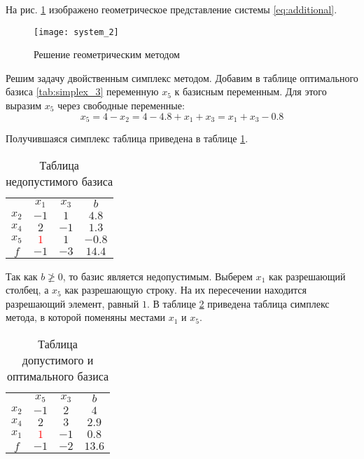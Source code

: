 На рис. \ref{pic:geometric_solution_2} изображено геометрическое представление системы \ref{eq:additional}.

\begin{figure}[H]
\begin{center}
	\texttt{[image: system\_2]}
	\caption{Решение геометрическим методом}
	\label{pic:geometric_solution_2}
\end{center}
\end{figure}

Решим задачу двойственным симплекс методом. Добавим в таблице оптимального базиса 
\ref{tab:simplex_3} переменную $x_5$ к базисным переменным. Для этого выразим $x_5$ через свободные переменные:
\begin{equation*}
x_5 = 4 - x_2 = 4 - 4.8 + x_1 + x_3 = x_1 + x_3 - 0.8
\end{equation*}

Получившаяся симплекс таблица приведена в таблице \ref{tab:simplex_4}.

\begin{table}[H]
\begin{center}
	\def\tabcolsep{15pt}
	\def\arraystretch{1.3}
	\caption{Таблица недопустимого базиса}
	\label{tab:simplex_4}
	\begin{tabular}{|c||c|c||c|}
		\hline
		 & $x_1$ & $x_3$ & $b$ \\ 
		\hhline{|=#==#=|}
		$x_2$ & $-1$ & $1$ & $4.8$ \\ 
		\hline
		$x_4$ & $2$ & $-1$ & $1.3$ \\ 
		\hline
		$x_5$ & \textcolor{red}{\boldmath$1$} & $1$ & $-0.8$ \\ 
		\hhline{|=#==#=|}
		$f$ & $-1$ & $-3$ & $14.4$ \\ 
		\hline
	\end{tabular}
\end{center}
\end{table}

Так как $b \ngeq 0$, то базис является недопустимым. Выберем $x_1$ как разрешающий столбец, а $x_5$ как разрешающую строку. На их пересечении находится разрешающий элемент, равный $1$. В таблице \ref{tab:simplex_5} приведена таблица симплекс метода, в которой поменяны местами $x_1$ и $x_5$.

\begin{table}[H]
\begin{center}
	\def\tabcolsep{15pt}
	\def\arraystretch{1.3}
	\caption{Таблица допустимого и оптимального базиса}
	\label{tab:simplex_5}
	\begin{tabular}{|c||c|c||c|}
		\hline
		 & $x_5$ & $x_3$ & $b$ \\ 
		\hhline{|=#==#=|}
		$x_2$ & $-1$ & $2$ & $4$ \\ 
		\hline
		$x_4$ & $2$ & $3$ & $2.9$ \\ 
		\hline
		$x_1$ & \textcolor{red}{\boldmath$1$} & $-1$ & $0.8$ \\ 
		\hhline{|=#==#=|}
		$f$ & $-1$ & $-2$ & $13.6$ \\ 
		\hline
	\end{tabular}
\end{center}
\end{table}

